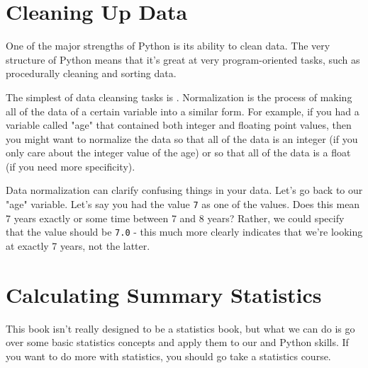\section{Cleaning Up Data}
One of the major strengths of Python is its ability to clean data. The very structure of Python means that it's great at very program-oriented tasks, such as procedurally cleaning and sorting data.\par
The simplest of data cleansing tasks is . Normalization is the process of making all of the data of a certain variable into a similar form. For example, if you had a variable called "age" that contained both integer and floating point values, then you might want to normalize the data so that all of the data is an integer (if you only care about the integer value of the age) or so that all of the data is a float (if you need more specificity).\par
Data normalization can clarify confusing things in your data. Let's go back to our "age" variable. Let's say you had the value \verb|7| as one of the values. Does this mean 7 years exactly or some time between 7 and 8 years? Rather, we could specify that the value should be \verb|7.0| - this much more clearly indicates that we're looking at exactly 7 years, not the latter.\par
\section{Calculating Summary Statistics}
This book isn't really designed to be a statistics book, but what we can do is go over some basic statistics concepts and apply them to our  and Python skills. If you want to do more with statistics, you should go take a statistics course.\par
{}
